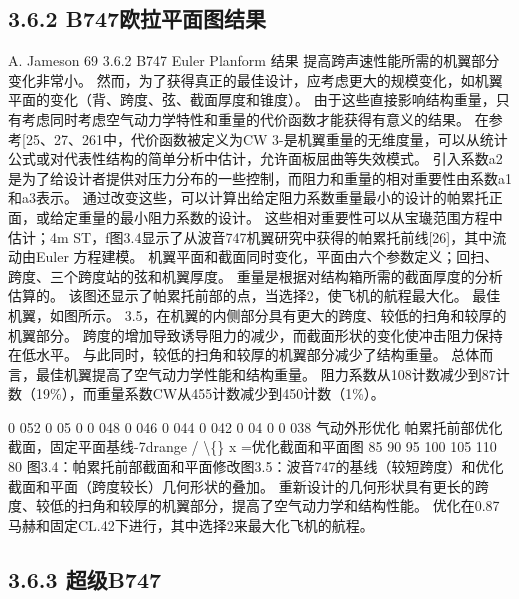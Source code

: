 \documentclass[UTF8,11pt,a4paper,openany,fontset=fandol]{ctexbook}
\begin{document}
\subsection{3.6.2 B747欧拉平面图结果}
A. Jameson 69 3.6.2 B747 Euler Planform 结果 提高跨声速性能所需的机翼部分变化非常小。 然而，为了获得真正的最佳设计，应考虑更大的规模变化，如机翼平面的变化（背、跨度、弦、截面厚度和锥度）。 由于这些直接影响结构重量，只有考虑同时考虑空气动力学特性和重量的代价函数才能获得有意义的结果。 在参考[25、27、261中，代价函数被定义为CW 3-是机翼重量的无维度量，可以从统计公式或对代表性结构的简单分析中估计，允许面板屈曲等失效模式。 引入系数a2是为了给设计者提供对压力分布的一些控制，而阻力和重量的相对重要性由系数a1和a3表示。 通过改变这些，可以计算出给定阻力系数重量最小的设计的帕累托正面，或给定重量的最小阻力系数的设计。 这些相对重要性可以从宝璏范围方程中估计；4m ST，f图3.4显示了从波音747机翼研究中获得的帕累托前线[26]，其中流动由Euler 方程建模。 机翼平面和截面同时变化，平面由六个参数定义；回扫、跨度、三个跨度站的弦和机翼厚度。 重量是根据对结构箱所需的截面厚度的分析估算的。 该图还显示了帕累托前部的点，当选择2，使飞机的航程最大化。 最佳机翼，如图所示。 3.5，在机翼的内侧部分具有更大的跨度、较低的扫角和较厚的机翼部分。 跨度的增加导致诱导阻力的减少，而截面形状的变化使冲击阻力保持在低水平。 与此同时，较低的扫角和较厚的机翼部分减少了结构重量。 总体而言，最佳机翼提高了空气动力学性能和结构重量。 阻力系数从108计数减少到87计数（19\%），而重量系数CW从455计数减少到450计数（1\%）。

0 052 0 05 0 0 048 0 046 0 044 0 042 0 04 0 0 038 气动外形优化 帕累托前部优化截面，固定平面基线-7drange / \textbackslash\{\} x =优化截面和平面图 85 90 95 100 105 110 80 图3.4：帕累托前部截面和平面修改图3.5：波音747的基线（较短跨度）和优化截面和平面（跨度较长）几何形状的叠加。 重新设计的几何形状具有更长的跨度、较低的扫角和较厚的机翼部分，提高了空气动力学和结构性能。 优化在0.87马赫和固定CL.42下进行，其中选择2来最大化飞机的航程。

\subsection{3.6.3 超级B747}
\end{document}
